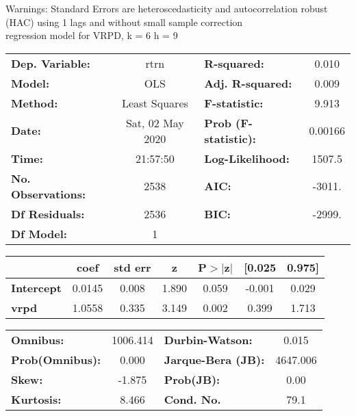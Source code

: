 Warnings: \newline
 [1] Standard Errors are heteroscedasticity and autocorrelation robust (HAC) using 1 lags and without small sample correction\\ 

regression model for VRPD, k = 6 h = 9\begin{center}
\begin{tabular}{lclc}
\toprule
\textbf{Dep. Variable:}    &       rtrn       & \textbf{  R-squared:         } &     0.010   \\
\textbf{Model:}            &       OLS        & \textbf{  Adj. R-squared:    } &     0.009   \\
\textbf{Method:}           &  Least Squares   & \textbf{  F-statistic:       } &     9.913   \\
\textbf{Date:}             & Sat, 02 May 2020 & \textbf{  Prob (F-statistic):} &  0.00166    \\
\textbf{Time:}             &     21:57:50     & \textbf{  Log-Likelihood:    } &    1507.5   \\
\textbf{No. Observations:} &        2538      & \textbf{  AIC:               } &    -3011.   \\
\textbf{Df Residuals:}     &        2536      & \textbf{  BIC:               } &    -2999.   \\
\textbf{Df Model:}         &           1      & \textbf{                     } &             \\
\bottomrule
\end{tabular}
\begin{tabular}{lcccccc}
                   & \textbf{coef} & \textbf{std err} & \textbf{z} & \textbf{P$> |$z$|$} & \textbf{[0.025} & \textbf{0.975]}  \\
\midrule
\textbf{Intercept} &       0.0145  &        0.008     &     1.890  &         0.059        &       -0.001    &        0.029     \\
\textbf{vrpd}      &       1.0558  &        0.335     &     3.149  &         0.002        &        0.399    &        1.713     \\
\bottomrule
\end{tabular}
\begin{tabular}{lclc}
\textbf{Omnibus:}       & 1006.414 & \textbf{  Durbin-Watson:     } &    0.015  \\
\textbf{Prob(Omnibus):} &   0.000  & \textbf{  Jarque-Bera (JB):  } & 4647.006  \\
\textbf{Skew:}          &  -1.875  & \textbf{  Prob(JB):          } &     0.00  \\
\textbf{Kurtosis:}      &   8.466  & \textbf{  Cond. No.          } &     79.1  \\
\bottomrule
\end{tabular}
\end{center}

